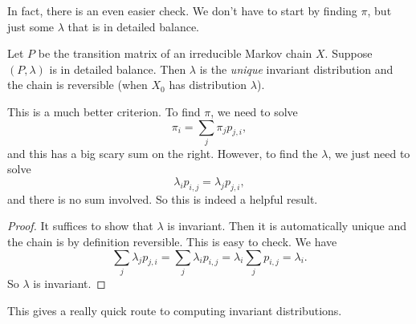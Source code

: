 \documentclass[a4paper]{article}
\begin{document}
In fact, there is an even easier check. We don't have to start by finding $\pi$, but just some $\lambda$ that is in detailed balance.

\begin{prop}
  Let $P$ be the transition matrix of an irreducible Markov chain $X$. Suppose $(P, \lambda)$ is in detailed balance. Then $\lambda$ is the \emph{unique} invariant distribution and the chain is reversible (when $X_0$ has distribution $\lambda$).
\end{prop}

This is a much better criterion. To find $\pi$, we need to solve
\[
  \pi_i = \sum_j \pi_j p_{j, i},
\]
and this has a big scary sum on the right. However, to find the $\lambda$, we just need to solve
\[
  \lambda_i p_{i, j} = \lambda_j p_{j, i},
\]
and there is no sum involved. So this is indeed a helpful result.

\begin{proof}
  It suffices to show that $\lambda$ is invariant. Then it is automatically unique and the chain is by definition reversible. This is easy to check. We have
  \[
    \sum_j \lambda_j p_{j, i} = \sum_j \lambda_i p_{i, j} = \lambda_i \sum_j p_{i, j} = \lambda_i.
  \]
  So $\lambda$ is invariant.
\end{proof}
This gives a really quick route to computing invariant distributions.
\end{document}
